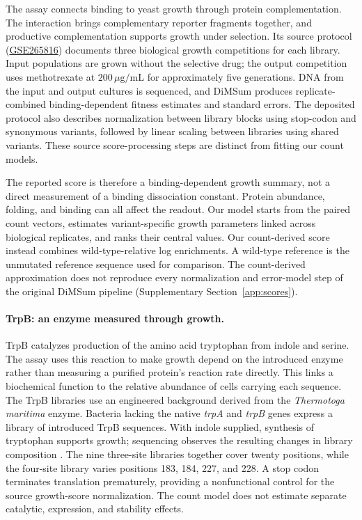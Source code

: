 The assay connects binding to yeast growth through protein
complementation. The interaction brings complementary reporter fragments
together, and productive complementation supports growth under selection.
Its source protocol
(\href{https://www.ncbi.nlm.nih.gov/geo/query/acc.cgi?acc=GSE265816}{GSE265816})
documents three biological growth competitions for each library. Input
populations are grown without the selective drug; the output competition
uses methotrexate at $200\,\mu\mathrm{g}/\mathrm{mL}$ for approximately five
generations. DNA from the input and output cultures is sequenced, and DiMSum
produces replicate-combined binding-dependent fitness estimates and standard
errors. The deposited protocol also describes normalization between library
blocks using stop-codon and synonymous variants, followed by linear scaling
between libraries using shared variants. These source score-processing steps
are distinct from fitting our count models.

The reported score is therefore a binding-dependent growth summary,
not a direct measurement of a binding dissociation constant. Protein
abundance, folding, and binding can all affect the readout. Our model
starts from the paired count vectors, estimates variant-specific growth
parameters linked across biological replicates, and ranks their central
values. Our count-derived score instead combines wild-type-relative log
enrichments. A wild-type reference is the unmutated reference sequence
used for comparison. The count-derived approximation does not reproduce
every normalization and error-model step of the original DiMSum pipeline
(Supplementary Section~\ref{app:scores}).

\paragraph{TrpB: an enzyme measured through growth.}
TrpB catalyzes production of the amino acid tryptophan from indole and
serine. The assay uses this reaction to make growth depend on the
introduced enzyme rather than measuring a purified protein's reaction
rate directly. This links a biochemical function to the relative
abundance of cells carrying each sequence.
The TrpB libraries use an engineered background derived from the
\emph{Thermotoga maritima} enzyme. Bacteria lacking the native
\textit{trpA} and \textit{trpB} genes express a library of introduced TrpB
sequences. With indole supplied, synthesis of tryptophan supports growth;
sequencing observes the resulting changes in library composition
\citep{johnston2024}. The nine three-site libraries together cover twenty
positions, while the four-site library varies positions 183, 184, 227, and
228. A stop codon terminates translation prematurely, providing a
nonfunctional control for the source growth-score normalization. The count
model does not estimate separate catalytic, expression, and stability effects.

